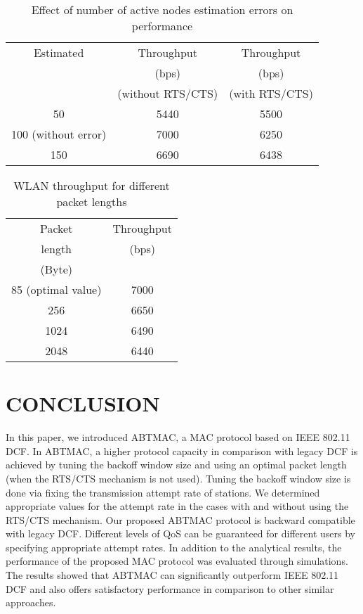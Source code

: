 \documentclass[10pt,twocolumn,oneside,submit]{JCNtran}
\begin{document}
\begin{table}
\caption{Effect of number of active nodes estimation errors on performance}
\label{tab:tab4}
\begin{center}
{\small \begin{tabular}{|c|c|c|}\hline
 Estimated & Throughput & Throughput \\
 & (bps) & (bps) \\
  & (without RTS/CTS) & (with RTS/CTS) \\  
\hline
50 & 5440 & 5500\\
100 (without error) & 7000 & 6250 \\
150 & 6690 & 6438 \\ \hline
\end{tabular}}
\end{center}
\end{table}
\begin{table}
\caption{WLAN throughput for different packet lengths}
\label{tab:tab5}
\begin{center}
{\small \begin{tabular}{|c|c|}\hline
 Packet & Throughput \\
length & (bps) \\
 (Byte) &  \\  
\hline
85 (optimal value) & 7000\\
256 & 6650 \\
1024 & 6490 \\
2048 & 6440 \\ \hline
\end{tabular}}
\end{center}
\end{table}
\vspace{10pt}
\section{\uppercase{CONCLUSION}}
\label{sec:conc}
\par In this paper, we introduced ABTMAC, a MAC protocol based on IEEE 802.11 DCF. In ABTMAC, a higher protocol capacity in comparison with legacy DCF is achieved by tuning the backoff window size and using an optimal packet length (when the RTS/CTS mechanism is not used). Tuning the backoff window size is done via fixing the transmission attempt rate of stations. We determined appropriate values for the attempt rate in the cases with and without using the RTS/CTS mechanism. Our proposed ABTMAC protocol is backward compatible with legacy DCF. Different levels of QoS can be guaranteed for different users by specifying appropriate attempt rates. In addition to the analytical results, the performance of the proposed MAC protocol was evaluated through simulations. The results showed that ABTMAC can significantly outperform IEEE 802.11 DCF and also offers satisfactory performance in comparison to other similar approaches.

\end{document}
